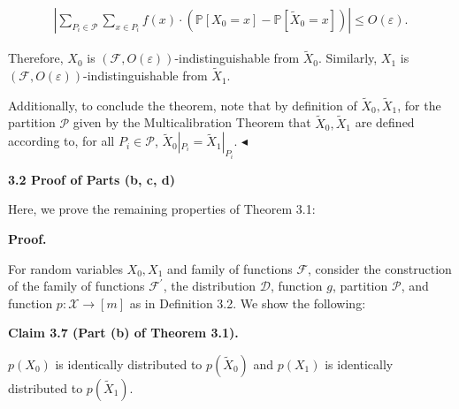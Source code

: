 \[\begin{gathered}
\left|\sum_{P_{i}\in\mathcal{P}}\sum_{x\in P_{i}}f(x)\cdot\left(\mathbb{P}[X_{0}=x]-\mathbb{P}[\widetilde{X}_{0}=x]\right)\right|\leq O(\varepsilon).
\end{gathered}\]


Therefore, $X_{0}$ is $(\mathcal{F},O(\varepsilon))$-indistinguishable from $\widetilde{X}_{0}$. Similarly, $X_{1}$ is $(\mathcal{F},O(\varepsilon))$-indistinguishable from $\widetilde{X}_{1}$.\par




Additionally, to conclude the theorem, note that by definition of $\widetilde{X}_{0},\widetilde{X}_{1}$, for the partition $\mathcal{P}$ given by the Multicalibration Theorem that $\widetilde{X}_{0},\widetilde{X}_{1}$ are defined according to, for all $P_{i}\in\mathcal{P}$, $\widetilde{X}_{0}|_{P_{i}}=\widetilde{X}_{1}|_{P_{i}}$.
$\blacktriangleleft$\par






\par\medskip\noindent\textbf{
3.2 Proof of Parts (b, c, d)}\par




Here, we prove the remaining properties of Theorem 3.1:\par




\par\medskip\noindent\textbf{Proof.}\par




For random variables $X_{0},X_{1}$ and family of functions $\mathcal{F}$, consider the construction of the family of functions $\mathcal{F}^{\prime}$, the distribution $\mathcal{D}$, function $g$, partition $\mathcal{P}$, and function $p:\mathcal{X}\to[m]$ as in Definition 3.2. We show the following:\par





\par\medskip\noindent\textbf{
Claim 3.7 (Part (b) of Theorem 3.1). 
}\par



$p(X_{0})$ is identically distributed to $p(\widetilde{X}_{0})$ and $p(X_{1})$ is identically distributed to $p(\widetilde{X}_{1})$.\par



